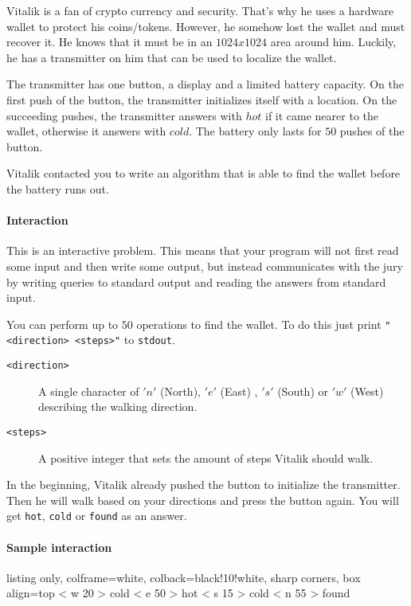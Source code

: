 




Vitalik is a fan of crypto currency and security.
That's why he uses a hardware wallet to protect his coins/tokens.
However, he somehow lost the wallet and must recover it.
He knows that it must be in an $1024 x 1024$ area around him.
Luckily, he has a transmitter on him that can be used to localize the wallet.

The transmitter has one button, a display and a limited battery capacity.
On the first push of the button, the transmitter initializes itself with a location.
On the succeeding pushes, the transmitter answers with $hot$ if it came nearer to the wallet,
otherwise it answers with  $cold$.  The battery only lasts for $50$ pushes of the button.

Vitalik contacted you to write an algorithm that is able to find the wallet before the battery runs out.

\paragraph*{Interaction}

This is an interactive problem. This means that your program will not first
read some input and then write some output, but instead communicates with
the jury by writing queries to standard output and reading the answers from
standard input.

You can perform up to $50$ operations to find the wallet. To do this just print
\texttt{"<direction> <steps>"} to \texttt{stdout}.

\begin{description}
    \item[\texttt{<direction>}] A single character of  $'n'$ (North), $'e'$ (East) , $'s'$ (South) or $'w'$ (West) describing the walking direction.
    \item[\texttt{<steps>}] A positive integer that sets the amount of steps Vitalik should walk.
\end{description}

In the beginning, Vitalik already pushed the button to initialize the transmitter.
Then he will walk based on your directions and press the button again.
You will get \texttt{hot}, \texttt{cold} or \texttt{found} as an answer.

\paragraph*{Sample interaction}

\noindent\begin{tcblisting}{listing only, colframe=white, colback=black!10!white, sharp corners, box align=top}
< w 20
> cold
< e 50
> hot
< s 15
> cold
< n 55
> found

\end{tcblisting}

